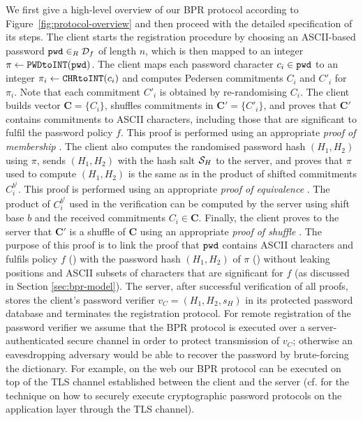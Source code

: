 We first give a high-level overview of our \ac{BPR} protocol according to Figure~\ref{fig:protocol-overview} and then proceed with the detailed specification of its steps. The client starts the registration procedure by choosing an ASCII-based password $\mathtt{pwd}\in_R\mathcal{D}_f$ of length $n$, which is then mapped to an integer $\pi\gets\texttt{PWDtoINT}(\mathtt{pwd})$.
The client maps each password character $c_i\in\mathtt{pwd}$ to an integer $\pi_i\gets\texttt{CHRtoINT}(c_i)$ and computes Pedersen commitments $C_i$ and $C'_i$ for $\pi_i$. 
Note that each commitment $C'_i$ is obtained by re-randomising $C_i$. 
The client builds vector $\bm{C}=\{C_i\}$, shuffles commitments in $\bm{C'}=\{C'_i\}$, and proves that $\bm C'$ contains commitments to ASCII characters, including those that are significant to fulfil the password policy $f$. 
This proof is performed using an appropriate \emph{proof of membership} \PoM.
The client also computes the randomised password hash $(H_1, H_2)$ using $\pi$, sends $(H_1, H_2)$ with the hash salt $\mathcal{S}_H$ to the server, and proves that $\pi$ used to compute $(H_1, H_2)$ is the same as in the product of shifted commitments $C^{{b^i}}_i$. 
This proof is performed using an appropriate \emph{proof of equivalence} \PoE.
The product of $C^{b^i}_i$ used in the verification can be computed by the server using shift base $b$ and the received commitments $C_i\in \bm C$.
Finally, the client proves to the server that $\bm C'$ is a shuffle of $\bm C$ using an appropriate \emph{proof of shuffle} \PoS. 
The purpose of this proof is to link the proof that $\mathtt{pwd}$ contains ASCII characters and fulfils policy $f$ (\PoM) with the password hash $(H_1, H_2)$ of $\pi$ (\PoE) without leaking positions and ASCII subsets of characters that are significant for $f$ (as discussed in Section \ref{sec:bpr-model}). 
The server, after successful verification of all proofs, stores the client's password verifier $v_C = (H_1,H_2,s_H)$ in its protected password database and terminates the registration protocol. 
For remote registration of the password verifier we assume that the \ac{BPR} protocol is executed over a server-authenticated secure channel in order to protect transmission of $v_C$; otherwise an eavesdropping adversary would be able to recover the password by brute-forcing the dictionary. 
For example, on the web our \ac{BPR} protocol can be executed on top of the TLS channel established between the client and the server (cf. \citet{Manulis2014} for the technique on how to securely execute cryptographic password protocols on the application layer through the TLS channel).


